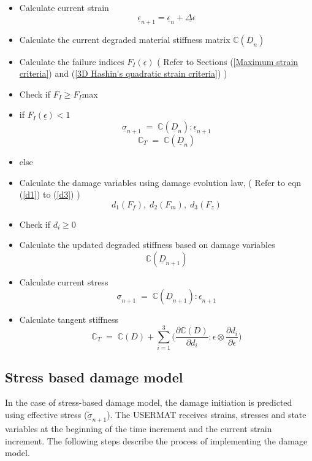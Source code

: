 \documentclass[12pt,twoside]{report}
\begin{document}
\begin{itemize}
\item Calculate current strain \textbf{$$ \underline{\epsilon}_{n+1} = \underline{\epsilon}_{n} + \underline{\Delta \epsilon} $$}
\item Calculate the current degraded material stiffness matrix  \textbf{$\mathbb{C}(\underline{D}_{n})$}
\item Calculate the failure indices \textbf{$F_{I}(\underline{\epsilon})$} \;\; ( Refer to Sections (\ref{Maximum strain criteria}) and (\ref{3D Hashin's quadratic strain criteria}) )
\item[] Check if $F_{I} \geq F_{I}$max
\item if \textbf{$F_{I}(\underline{\epsilon})<1$} \textbf{$$\underline{\sigma}_{n+1} \; = \; \mathbb{C}(\underline{D}_{n}) :  \underline{\epsilon}_{n+1} $$} \textbf{$$\mathbb{C}_{T} \; = \; \mathbb{C}(\underline{D}_{n})$$}
\item else
\item[]  Calculate the damage variables using damage evolution law, \;\; ( Refer to eqn (\ref{d1}) to (\ref{d3}) ) \textbf{$$d_{1}(F_{f}),\;d_{2}(F_{m}),\;d_{3}(F_{z})$$}
\item[]  Check if $d_{i} \geq 0 $ 
\item[]  Calculate the updated degraded stiffness based on damage variables \textbf{$$\mathbb{C}(\underline{D}_{n+1})$$}
\item[]  Calculate current stress  \textbf{$$\underline{\sigma}_{n+1} \; = \; \mathbb{C}(\underline{D}_{n+1}) :  \underline{\epsilon}_{n+1} $$}
\item[] Calculate tangent stiffness \textbf{$$\mathbb{C}_{T}  \; = \;\mathbb{C}(D) + \sum_{i = 1}^{3} \Big( \frac{\partial \mathbb{C}(D) }{\partial d_{i}} : \epsilon \otimes \frac{\partial d_{i}}{\partial \epsilon }\Big)$$}
	
\end{itemize} 


\subsection{Stress based damage model}
\indent\indent\indent  In the case of stress-based damage model, the damage initiation is predicted using effective stress ($\underline{\tilde{\sigma}}_{n+1}$).  The USERMAT receives strains, stresses and state variables at the beginning of the time increment and the current strain increment. The following steps describe the process of implementing the damage model.
\end{document}
